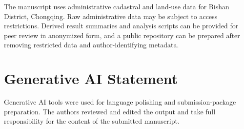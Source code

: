 \documentclass[11pt]{article}
\begin{document}
The manuscript uses administrative cadastral and land-use data for Bishan District, Chongqing. Raw administrative data may be subject to access restrictions. Derived result summaries and analysis scripts can be provided for peer review in anonymized form, and a public repository can be prepared after removing restricted data and author-identifying metadata.

\section*{Generative AI Statement}

Generative AI tools were used for language polishing and submission-package preparation. The authors reviewed and edited the output and take full responsibility for the content of the submitted manuscript.
\end{document}
